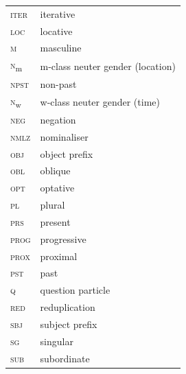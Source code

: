 \documentclass[output=paper,colorlinks,citecolor=brown]{langscibook}
\begin{document}
\begin{tabularx}{.54\textwidth}{lQ}%
\scshape iter & iterative \\
\scshape loc & locative \\
\scshape m & masculine \\
\textsc{n}\textsubscript{m} & m-class neuter gender (location) \\
\scshape npst & non-past \\
\textsc{n}\textsubscript{w} & w-class neuter gender (time) \\
\scshape neg & negation \\
\scshape nmlz & nominaliser \\
\scshape obj & object prefix \\
\scshape obl & oblique \\
\scshape opt & optative \\
\scshape pl & plural \\
\scshape prs & present \\
\scshape prog & progressive\\
\scshape prox & proximal \\
\scshape pst & past \\
\scshape q & question particle \\
\scshape red & reduplication \\
\scshape sbj & subject prefix \\
\scshape sg & singular \\
\scshape sub & subordinate \\
\end{tabularx}

\printbibliography[heading=subbibliography,notkeyword=this]
\end{document}
